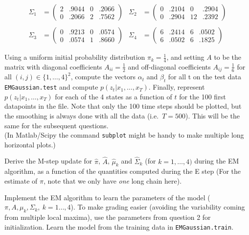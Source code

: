 \documentclass[12pt]{article}
\newcommand{\1}{{\bf 1}}
\begin{document}
\begin{align*}
\Sigma_1 &= \left( \begin{aligned}
2&.9044 &   0&.2066 \\
0&.2066 &   2&.7562
\end{aligned}
\right) &
\Sigma_2 &= \left( \begin{aligned}
0&.2104 &   0&.2904 \\
0&.2904 &   12&.2392
\end{aligned}
\right) 
\\
\\
\Sigma_3 &= \left( \begin{aligned}
0&.9213 &   0&.0574 \\
0&.0574 &   1&.8660
\end{aligned}
\right) &
\Sigma_4 &= \left( \begin{aligned}
6&.2414 &   6&.0502 \\
6&.0502 &   6&.1825
\end{aligned}
\right) 
\end{align*}



Using a uniform initial probability distribution $\pi_k = \frac{1}{4}$, and setting $A$ to be the matrix with diagonal coefficients $A_{ii}=\frac{1}{2}$ and off-diagonal coefficients $A_{ij}=\frac{1}{6}$ for all $(i,j) \in \{1,\ldots,4\}^2$, compute the vectors $\alpha_t$ and $\beta_t$ for all t on the test data \texttt{EMGaussian.test} and compute $p(z_t|x_1,\dots,x_T)$.
Finally, represent $p(z_t|x_1,\dots,x_T)$ for each of the 4 states as a function of $t$ for the 100 first datapoints in the file.
Note that only the 100 time steps should be plotted, but the smoothing is always done with all the data (i.e.\ $T=500$). This will be the same for the subsequent questions. \\
(In Matlab/Scipy the command \texttt{subplot} might be handy to make multiple long horizontal plots.)

\item Derive the M-step update for $\hat{\pi}$, $\hat{A}$, $\hat{\mu}_k$ and $\hat{\Sigma}_k$ (for $k=1,\ldots, 4)$ during the EM algorithm, as a function of the quantities computed during the E step (For the estimate of $\pi$, note that we only have \emph{one} long chain here).

\item Implement the EM algorithm to learn the parameters of the model ($\pi,A,\mu_k,\Sigma_k,\: k=1\ldots,4$). To make grading easier (avoiding the variability coming from multiple local maxima), use the parameters from question 2 for initialization. Learn the model from the training data in \texttt{EMGaussian.train}.
\end{document}
